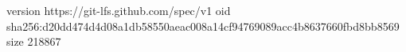 version https://git-lfs.github.com/spec/v1
oid sha256:d20dd474d4d08a1db58550aeac008a14cf94769089acc4b8637660fbd8bb8569
size 218867
